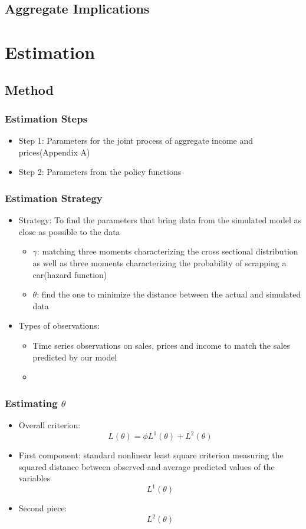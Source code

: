 \documentclass{beamer}
\begin{document}
\subsection{Aggregate Implications}
\begin{frame}
\frametitle{}
\end{frame}

\section{Estimation}
\subsection{Method}
\begin{frame}
\frametitle{Estimation Steps}
\begin{itemize}
\item Step 1: Parameters for the joint process of aggregate income and prices(Appendix A)
\item Step 2: Parameters from the policy functions
\end{itemize}
\end{frame}

\begin{frame}
\frametitle{Estimation Strategy}
\begin{itemize}
\item Strategy: To find the parameters that bring data from the simulated model as close as possible to the data
\begin{itemize}
\item $\gamma$: matching three moments characterizing the cross sectional distribution as well as three moments characterizing the probability of scrapping a car(hazard function)
\item $\theta$: find the one to minimize the distance between the actual and simulated data 
\end{itemize}
\item Types of observations:
\begin{itemize}
\item Time series observations on sales, prices and income to match the sales predicted by our model
\item 
\end{itemize}
\end{itemize}
\end{frame}

\begin{frame}
\frametitle{Estimating $\theta$}
\begin{itemize}
\item Overall criterion:
$$
L(\theta)=\phi L^1(\theta)+L^2(\theta)
$$
\item First component: standard nonlinear least square criterion measuring the squared distance between observed and average predicted values of the variables
$$
L^1(\theta)
$$
\item Second piece: 
$$
L^2(\theta)
$$
\end{itemize}
\end{frame}
\end{document}
